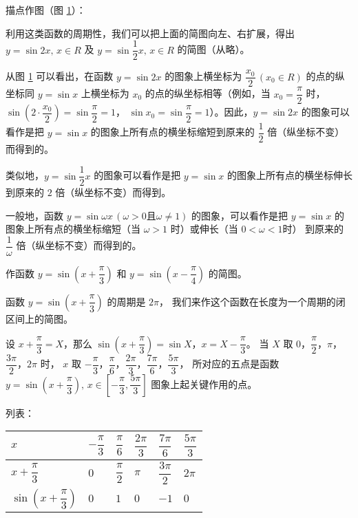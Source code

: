 描点作图（图 \ref{fig:2-24}）：

\begin{figure}[htbp]
    \centering
    
    \caption{}\label{fig:2-24}
\end{figure}

利用这类函数的周期性，我们可以把上面的简图向左、右扩展，得出 $y = \sin 2x, \, x \in R$ 及 $y = \sin \dfrac 1 2 x, \, x \in R$ 的简图（从略）。
\vspace{0.5em}

从图 \ref{fig:2-24} 可以看出，在函数 $y = \sin 2x$ 的图象上横坐标为 $\dfrac{x_0}{2} \, (x_0 \in R)$ \vspace{0.5em}
的点的纵坐标同 $y = \sin x$ 上横坐标为 $x_0$ 的点的纵坐标相等（例如，当 $x_0 = \dfrac \pi 2$
时，$\sin \left( 2 \cdot \dfrac{x_0}{2} \right) = \sin \dfrac \pi 2 = 1$，
$\sin x_0 = \sin \dfrac \pi 2 = 1$）。因此，$y = \sin 2x$ 的图象可以看作是把 $y = \sin x$
的图象上所有点的横坐标缩短到原来的 $\dfrac 1 2$ 倍（纵坐标不变）而得到的。

类似地，$y = \sin \dfrac 1 2 x$ 的图象可以看作是把 $y = \sin x$ 的图象上所有点的横坐标伸长到原来的 $2$ 倍（纵坐标不变）而得到。

一般地，函数  $y = \sin \omega x \, (\omega > 0 \text{且} \omega \neq 1)$ 的图象，可以看作是把
$y = \sin x$ 的图象上所有点的横坐标缩短（当 $\omega > 1$ 时）或伸长（当 $0 < \omega < 1$时）
到原来的 $\dfrac 1 \omega$ 倍（纵坐标不变）而得到的。

\liti 作函数 $y = \sin \left( x + \dfrac \pi 3 \right)$ 和 $y = \sin \left( x - \dfrac \pi 4 \right)$ 的简图。
\vspace{0.5em}

\jie 函数 $y = \sin \left( x + \dfrac \pi 3 \right)$ 的周期是 $2\pi$，
我们来作这个函数在长度为一个周期的闭区间上的简图。

设 $x + \dfrac \pi 3 = X$，那么 $\sin \left( x + \dfrac \pi 3 \right) = \sin X$，$x = X - \dfrac \pi 3$。
当 $X$ 取 $0$，$\dfrac \pi 2$，$\pi$，$\dfrac{3\pi}{2}$，$2\pi$ 时，
$x$ 取 $-\dfrac \pi 3$，$\dfrac \pi 6$，$\dfrac{2\pi}{3}$，$\dfrac{7\pi}{6}$，$\dfrac{5\pi}{3}$，
所对应的五点是函数 $y = \sin \left( x + \dfrac \pi 3 \right), \, x \in \left[ -\dfrac \pi 3, \dfrac{5\pi}{3} \right]$
图象上起关键作用的点。
\vspace{0.5em}

列表：

\begin{table}[H]
\renewcommand\arraystretch{2}
\begin{tabular}{|w{c}{8em}|*{5}{w{c}{3em}|}}
    \hline
    $x$ & $-\dfrac \pi 3$ & $\dfrac \pi 6$ & $\dfrac{2\pi}{3}$ & $\dfrac{7\pi}{6}$ & $\dfrac{5\pi}{3}$ \\ \hline
    $x + \dfrac \pi 3$ & $0$ & $\dfrac \pi 2$ & $\pi$ & $\dfrac{3\pi}{2}$ & $2\pi$ \\ \hline
    $\sin \left( x + \dfrac \pi 3 \right)$ & $0$ & $1$ & $0$ & $-1$ & $0$ \\ \hline
\end{tabular}
\end{table}


